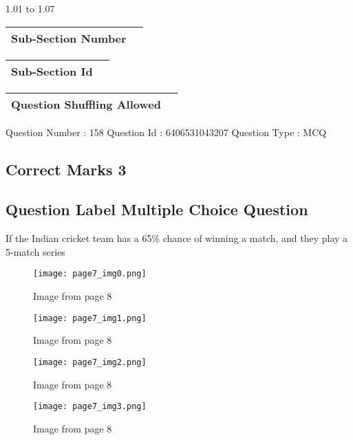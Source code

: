 \documentclass{article}
\begin{document}
1.01 to 1.07\\

\begin{longtable}{|c|c|}
\hline
\textbf{Sub-Section Number} & \textbf{} \\ \hline
\end{longtable}

\begin{longtable}{|c|c|}
\hline
\textbf{Sub-Section Id} & \textbf{} \\ \hline
\end{longtable}

\begin{longtable}{|c|c|}
\hline
\textbf{Question Shuffling Allowed} & \textbf{} \\ \hline
\end{longtable}

Question Number : 158 Question Id : 6406531043207 Question Type : MCQ\\

\subsection{Correct Marks  3}

\subsection{Question Label  Multiple Choice Question}

If the Indian cricket team has a 65\% chance of winning a match, and they play a 5-match series\\

\newpage
\begin{figure}[h]
\centering
\texttt{[image: page7\_img0.png]}
\caption{Image from page 8}
\end{figure}

\begin{figure}[h]
\centering
\texttt{[image: page7\_img1.png]}
\caption{Image from page 8}
\end{figure}

\begin{figure}[h]
\centering
\texttt{[image: page7\_img2.png]}
\caption{Image from page 8}
\end{figure}

\begin{figure}[h]
\centering
\texttt{[image: page7\_img3.png]}
\caption{Image from page 8}
\end{figure}
\end{document}
